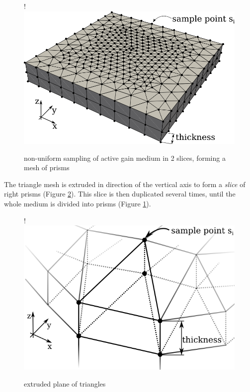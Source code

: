 \begin{figure}[H]
  \centerline{
     {!} {\includegraphics{graphics/samples_reduced.png}}
  }
  \caption{non-uniform sampling of active gain medium in 2 slices, forming a
  mesh of prisms}
  \label{graphic:samples_reduced}
\end{figure}

The triangle mesh is extruded in direction of the vertical axis to form a
\emph{slice} of right prisms (Figure \ref{graphic:extruded_mesh}). This
slice is then duplicated several times, until the whole medium is divided into
prisms (Figure \ref{graphic:samples_reduced}).

\begin{figure}[H]
  \centerline{
     {!} {\includegraphics{graphics/delauny_4.png}}
  }
  \caption{extruded plane of triangles}
  \label{graphic:extruded_mesh}
\end{figure}

